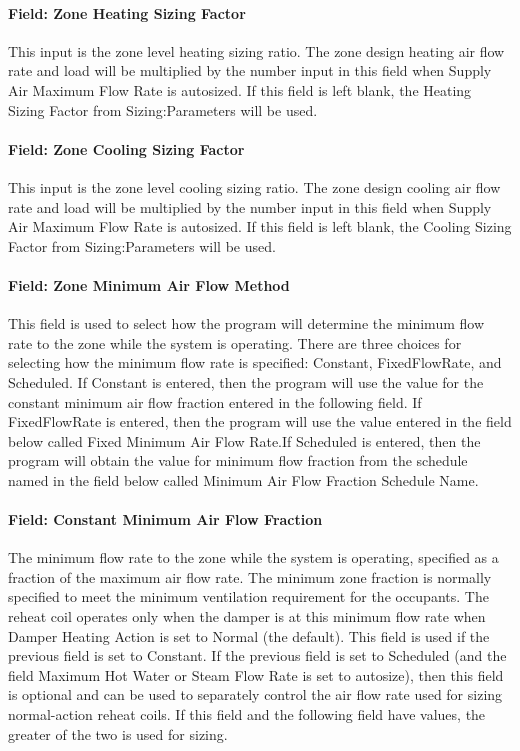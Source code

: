 \paragraph{Field: Zone Heating Sizing Factor}\label{field-zone-heating-sizing-factor-7}

This input is the zone level heating sizing ratio. The zone design heating air flow rate and load will be multiplied by the number input in this field when Supply Air Maximum Flow Rate is autosized. If this field is left blank, the Heating Sizing Factor from Sizing:Parameters will be used.

\paragraph{Field: Zone Cooling Sizing Factor}\label{field-zone-cooling-sizing-factor-6}

This input is the zone level cooling sizing ratio. The zone design cooling air flow rate and load will be multiplied by the number input in this field when Supply Air Maximum Flow Rate is autosized. If this field is left blank, the Cooling Sizing Factor from Sizing:Parameters will be used.

\paragraph{Field: Zone Minimum Air Flow Method}\label{field-zone-minimum-air-flow-method-000}

This field is used to select how the program will determine the minimum flow rate to the zone while the system is operating. There are three choices for selecting how the minimum flow rate is specified: Constant, FixedFlowRate, and Scheduled. If Constant is entered, then the program will use the value for the constant minimum air flow fraction entered in the following field. If FixedFlowRate is entered, then the program will use the value entered in the field below called Fixed Minimum Air Flow Rate.If Scheduled is entered, then the program will obtain the value for minimum flow fraction from the schedule named in the field below called Minimum Air Flow Fraction Schedule Name.

\paragraph{Field: Constant Minimum Air Flow Fraction}\label{field-constant-minimum-air-flow-fraction-000}

The minimum flow rate to the zone while the system is operating, specified as a fraction of the maximum air flow rate. The minimum zone fraction is normally specified to meet the minimum ventilation requirement for the occupants. The reheat coil operates only when the damper is at this minimum flow rate when Damper Heating Action is set to Normal (the default). This field is used if the previous field is set to Constant. If the previous field is set to Scheduled (and the field Maximum Hot Water or Steam Flow Rate is set to autosize), then this field is optional and can be used to separately control the air flow rate used for sizing normal-action reheat coils. If this field and the following field have values, the greater of the two is used for sizing.

